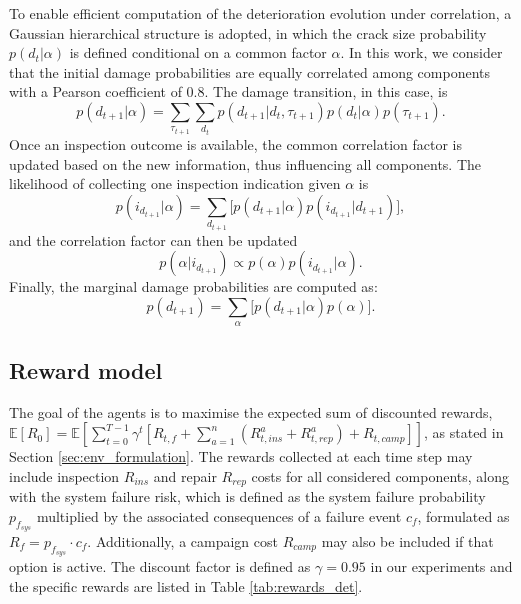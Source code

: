 To enable efficient computation of the deterioration evolution under correlation, a Gaussian hierarchical structure is adopted, in which the crack size probability $p(d_{t}|\alpha)$ is defined conditional on a common factor $\alpha$\citep{morato2022syst}. 
In this work, we consider that the initial damage probabilities are equally correlated among components with a Pearson coefficient of 0.8. 
The damage transition, in this case, is
\begin{equation} \label{eq:ex_pod4}
    p(d_{t+1}|\alpha) =  \sum_{\tau_{t+1}} \sum_{d_t} p(d_{t+1}|d_t,\tau_{t+1}) p(d_{t}|\alpha) p(\tau_{t+1})   .
\end{equation}
Once an inspection outcome is available, the common correlation factor is updated based on the new information, thus influencing all components.
The likelihood of collecting one inspection indication given $\alpha$ is
\begin{equation}\label{Eq:margHyp}
p(i_{d_{t+1}}|\alpha)=\sum_{d_{t+1}} \Big[p(d_{t+1}|\alpha) p(i_{d_{t+1}}|d_{t+1})\Big]   ,
\end{equation}
and the correlation factor can then be updated
\begin{equation}\label{Eq:infHyp}
p(\alpha|i_{d_{t+1}}) \propto p(\alpha)p(i_{d_{t+1}}|\alpha) .
\end{equation}
Finally, the marginal damage probabilities are computed as:
\begin{equation}\label{Eq:margBel}
p(d_{t+1}) = \sum_{\alpha} \Big[p(d_{t+1}|\alpha)  p({\alpha}) \Big]   .
\end{equation}
 
\subsection{Reward model}\label{sec:ch5_rewardmodel}
The goal of the agents is to maximise the expected sum of discounted rewards, $\mathbb{E}[R_{0}] = \mathbb{E} \left[ \sum_{t=0}^{T-1} \gamma^t \left[ R_{t,f}+ \sum_{a=1}^n \left({R_{t,ins}^a} + {R_{t,rep}^a}\right)+R_{t,camp} \right] \right]$, as stated in Section \ref{sec:env_formulation}.
The rewards collected at each time step may include inspection $R_{ins}$ and repair $R_{rep}$ costs for all considered components, along with the system failure risk, which is defined as the system failure probability $p_{f_{sys}}$ multiplied by the associated consequences of a failure event $c_f$, formulated as $R_f = p_{f_{sys}} \cdot c_f$. Additionally, a campaign cost $R_{camp}$ may also be included if that option is active.
The discount factor is defined as $\gamma=0.95$ in our experiments and the specific rewards are listed in Table \ref{tab:rewards_det}.


